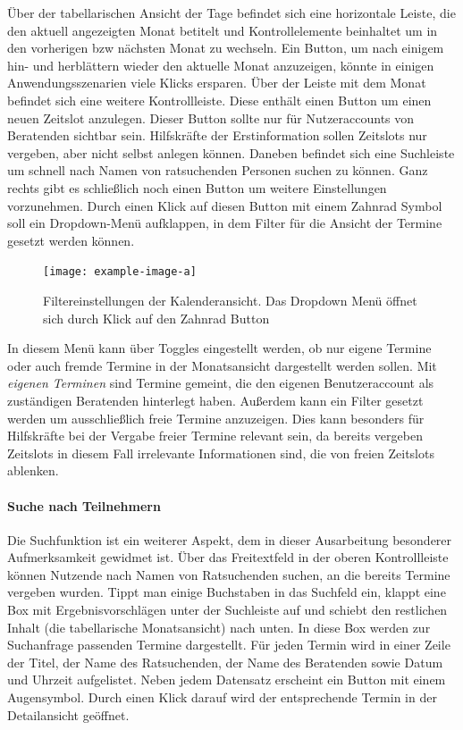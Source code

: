 \documentclass[12pt]{article}
\begin{document}
Über der tabellarischen Ansicht der Tage befindet sich eine horizontale Leiste, die den aktuell angezeigten Monat betitelt und Kontrollelemente beinhaltet um in den vorherigen bzw nächsten Monat zu wechseln. Ein Button, um nach einigem hin- und herblättern wieder den aktuelle Monat anzuzeigen, könnte in einigen Anwendungsszenarien viele Klicks ersparen. Über der Leiste mit dem Monat befindet sich eine weitere Kontrollleiste. Diese enthält einen Button um einen neuen Zeitslot anzulegen. Dieser Button sollte nur für Nutzeraccounts von Beratenden sichtbar sein. Hilfskräfte der Erstinformation sollen Zeitslots nur vergeben, aber nicht selbst anlegen können. Daneben befindet sich eine Suchleiste um schnell nach Namen von ratsuchenden Personen suchen zu können. Ganz rechts gibt es schließlich noch einen Button um weitere Einstellungen vorzunehmen. Durch einen Klick auf diesen Button mit einem Zahnrad Symbol soll ein Dropdown-Menü aufklappen, in dem Filter für die Ansicht der Termine gesetzt werden können.

\begin{figure}[h]
    \caption{Filtereinstellungen der Kalenderansicht. Das Dropdown Menü öffnet sich durch Klick auf den Zahnrad Button}
    \centering
    \texttt{[image: example-image-a]}
\end{figure}

In diesem Menü kann über Toggles eingestellt werden, ob nur eigene Termine oder
auch fremde Termine in der Monatsansicht dargestellt werden sollen. Mit
\textit{eigenen Terminen} sind Termine gemeint, die den eigenen Benutzeraccount
als zuständigen Beratenden hinterlegt haben. Außerdem kann ein Filter gesetzt
werden um ausschließlich freie Termine anzuzeigen. Dies kann besonders für
Hilfskräfte bei der Vergabe freier Termine relevant sein, da bereits vergeben
Zeitslots in diesem Fall irrelevante Informationen sind, die von freien
Zeitslots ablenken.

\paragraph{Suche nach Teilnehmern}

Die Suchfunktion ist ein weiterer Aspekt, dem in dieser Ausarbeitung besonderer
Aufmerksamkeit gewidmet ist. Über das Freitextfeld in der oberen Kontrollleiste
können Nutzende nach Namen von Ratsuchenden suchen, an die bereits Termine
vergeben wurden. Tippt man einige Buchstaben in das Suchfeld ein, klappt eine
Box mit Ergebnisvorschlägen unter der Suchleiste auf und schiebt den restlichen
Inhalt (die tabellarische Monatsansicht) nach unten. In diese Box werden zur
Suchanfrage passenden Termine dargestellt. Für jeden Termin wird in einer Zeile
der Titel, der Name des Ratsuchenden, der Name des Beratenden sowie Datum und
Uhrzeit aufgelistet. Neben jedem Datensatz erscheint ein Button mit einem
Augensymbol. Durch einen Klick darauf wird der entsprechende Termin in der
Detailansicht geöffnet.
\end{document}
